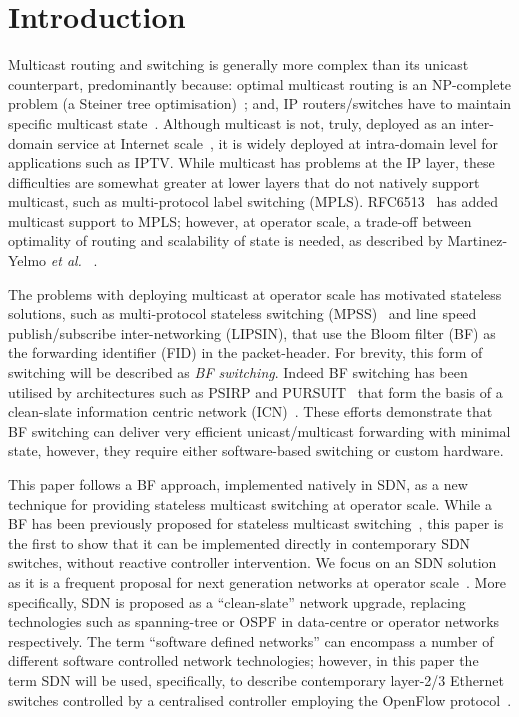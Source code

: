 \documentclass[conference]{IEEEtran}
\begin{document}
\section{Introduction}


Multicast routing and switching is generally more complex than its unicast counterpart, predominantly because: optimal multicast routing is an NP-complete problem (a Steiner tree optimisation)~\cite{Kompella1993}; and, IP routers/switches have to maintain specific multicast state~\cite{Martinez-Yelmo2007}. Although multicast is not, truly, deployed as an inter-domain service at Internet scale~\cite{Careglio2014}, it is widely deployed at intra-domain level for applications such as IPTV. While multicast has problems at the IP layer, these difficulties are somewhat greater at lower layers that do not natively support multicast, such as multi-protocol label switching (MPLS). RFC6513~\cite{Rosen12} has added multicast support to MPLS; however, at operator scale, a trade-off between optimality of routing and scalability of state is needed, as described by Martinez-Yelmo \emph{et al.} ~\cite{Martinez-Yelmo2007}. 

The problems with deploying multicast at operator scale has motivated stateless solutions, such as multi-protocol stateless switching (MPSS)~\cite{Zahemszky2010} and line speed publish/subscribe inter-networking (LIPSIN), that use the Bloom filter (BF) as the forwarding identifier (FID) in the packet-header. For brevity, this form of switching will be described as \emph{BF switching}. Indeed BF switching has been utilised by architectures such as PSIRP and PURSUIT~\cite{Fotiou10,Trossen2012} that form the basis of a clean-slate information centric network (ICN)~\cite{Xylomenos2014}. These efforts demonstrate that BF switching can deliver very efficient unicast/multicast forwarding with minimal state, however, they require either software-based switching or custom hardware.

This paper follows a BF approach, implemented natively in SDN, as a new technique for providing stateless multicast switching at operator scale. While a BF has been previously proposed for stateless multicast switching~\cite{Jokela09,Zahemszky2010}, this paper is the first to show that it can be implemented directly in contemporary SDN switches, without reactive controller intervention. We focus on an SDN solution as it is a frequent proposal for next generation networks at operator scale~\cite{Kreutz2015}. More specifically, SDN is proposed as a ``clean-slate'' network upgrade, replacing technologies such as spanning-tree or OSPF in data-centre or operator networks respectively. The term ``software defined networks'' can encompass a number of different software controlled network technologies; however, in this paper the term SDN will be used, specifically, to describe contemporary layer-2/3 Ethernet switches controlled by a centralised controller employing the OpenFlow protocol~\cite{OpenFlow1.2}.
\end{document}
